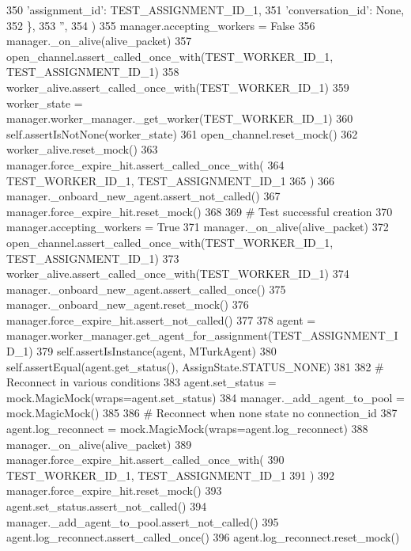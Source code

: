 \begin{DoxyCode}
350                 \textcolor{stringliteral}{'assignment\_id'}: TEST\_ASSIGNMENT\_ID\_1,
351                 \textcolor{stringliteral}{'conversation\_id'}: \textcolor{keywordtype}{None},
352             \},
353             \textcolor{stringliteral}{''},
354         )
355         manager.accepting\_workers = \textcolor{keyword}{False}
356         manager.\_on\_alive(alive\_packet)
357         open\_channel.assert\_called\_once\_with(TEST\_WORKER\_ID\_1, TEST\_ASSIGNMENT\_ID\_1)
358         worker\_alive.assert\_called\_once\_with(TEST\_WORKER\_ID\_1)
359         worker\_state = manager.worker\_manager.\_get\_worker(TEST\_WORKER\_ID\_1)
360         self.assertIsNotNone(worker\_state)
361         open\_channel.reset\_mock()
362         worker\_alive.reset\_mock()
363         manager.force\_expire\_hit.assert\_called\_once\_with(
364             TEST\_WORKER\_ID\_1, TEST\_ASSIGNMENT\_ID\_1
365         )
366         manager.\_onboard\_new\_agent.assert\_not\_called()
367         manager.force\_expire\_hit.reset\_mock()
368 
369         \textcolor{comment}{# Test successful creation}
370         manager.accepting\_workers = \textcolor{keyword}{True}
371         manager.\_on\_alive(alive\_packet)
372         open\_channel.assert\_called\_once\_with(TEST\_WORKER\_ID\_1, TEST\_ASSIGNMENT\_ID\_1)
373         worker\_alive.assert\_called\_once\_with(TEST\_WORKER\_ID\_1)
374         manager.\_onboard\_new\_agent.assert\_called\_once()
375         manager.\_onboard\_new\_agent.reset\_mock()
376         manager.force\_expire\_hit.assert\_not\_called()
377 
378         agent = manager.worker\_manager.get\_agent\_for\_assignment(TEST\_ASSIGNMENT\_ID\_1)
379         self.assertIsInstance(agent, MTurkAgent)
380         self.assertEqual(agent.get\_status(), AssignState.STATUS\_NONE)
381 
382         \textcolor{comment}{# Reconnect in various conditions}
383         agent.set\_status = mock.MagicMock(wraps=agent.set\_status)
384         manager.\_add\_agent\_to\_pool = mock.MagicMock()
385 
386         \textcolor{comment}{# Reconnect when none state no connection\_id}
387         agent.log\_reconnect = mock.MagicMock(wraps=agent.log\_reconnect)
388         manager.\_on\_alive(alive\_packet)
389         manager.force\_expire\_hit.assert\_called\_once\_with(
390             TEST\_WORKER\_ID\_1, TEST\_ASSIGNMENT\_ID\_1
391         )
392         manager.force\_expire\_hit.reset\_mock()
393         agent.set\_status.assert\_not\_called()
394         manager.\_add\_agent\_to\_pool.assert\_not\_called()
395         agent.log\_reconnect.assert\_called\_once()
396         agent.log\_reconnect.reset\_mock()

\end{DoxyCode}

